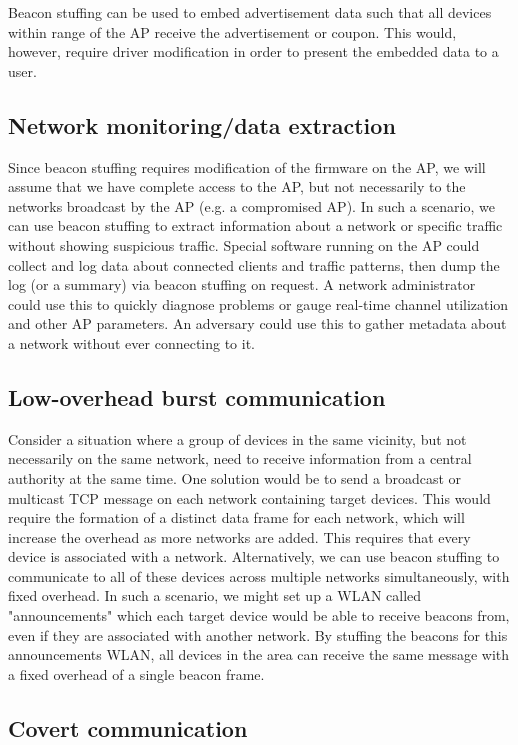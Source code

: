 \documentclass[letterpaper, 10 pt, conference]{ieeeconf}  %
\begin{document}
Beacon stuffing can be used to embed advertisement data such that all devices within range of the AP receive the advertisement or coupon.  This would, however, require driver modification in order to present the embedded data to a user. \cite{c1}

\subsection{Network monitoring/data extraction}

Since beacon stuffing requires modification of the firmware on the AP, we will assume that we have complete access to the AP, but not necessarily to the networks broadcast by the AP (e.g. a compromised AP).  In such a scenario, we can use beacon stuffing to extract information about a network or specific traffic without showing suspicious traffic.  Special software running on the AP could collect and log data about connected clients and traffic patterns, then dump the log (or a summary) via beacon stuffing on request. A network administrator could use this to quickly diagnose problems or gauge real-time channel utilization and other AP parameters.  An adversary could use this to gather metadata about a network without ever connecting to it.

\subsection{Low-overhead burst communication}

Consider a situation where a group of devices in the same vicinity, but not necessarily on the same network, need to receive information from a central authority at the same time.  One solution would be to send a broadcast or multicast TCP message on each network containing target devices.  This would require the formation of a distinct data frame for each network, which will increase the overhead as more networks are added.  This requires that every device is associated with a network.  Alternatively, we can use beacon stuffing to communicate to all of these devices across multiple networks simultaneously, with fixed overhead.  In such a scenario, we might set up a WLAN called "announcements" which each target device would be able to receive beacons from, even if they are associated with another network.  By stuffing the beacons for this announcements WLAN, all devices in the area can receive the same message with a fixed overhead of a single beacon frame.

\subsection{Covert communication}
\end{document}
